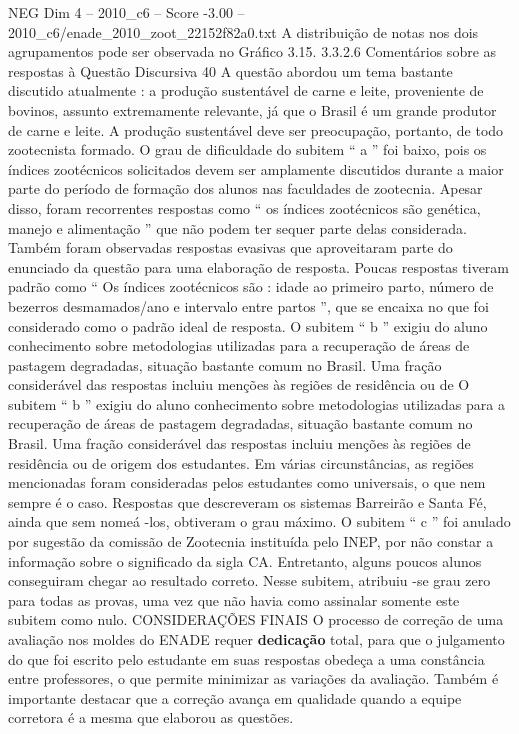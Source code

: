 \begin{textsample}{NEG Dim 4 – 2010\_c6 – Score -3.00 – 2010\_c6/enade\_2010\_zoot\_22152f82a0.txt}
A distribuição de notas nos dois agrupamentos pode ser observada no Gráfico 3.15. 3.3.2.6 Comentários sobre as respostas à Questão Discursiva 40 A questão abordou um tema bastante discutido atualmente : a produção sustentável de carne e leite, proveniente de bovinos, assunto extremamente relevante, já que o Brasil é um grande produtor de carne e leite.
A produção sustentável deve ser preocupação, portanto, de todo zootecnista formado.
O grau de dificuldade do subitem “ a ” foi baixo, pois os índices zootécnicos solicitados devem ser amplamente discutidos durante a maior parte do período de formação dos alunos nas faculdades de zootecnia.
Apesar disso, foram recorrentes respostas como “ os índices zootécnicos são genética, manejo e alimentação ” que não podem ter sequer parte delas considerada.
Também foram observadas respostas evasivas que aproveitaram parte do enunciado da questão para uma elaboração de resposta.
Poucas respostas tiveram padrão como “ Os índices zootécnicos são : idade ao primeiro parto, número de bezerros desmamados/ano e intervalo entre partos ”, que se encaixa no que foi considerado como o padrão ideal de resposta.
O subitem “ b ” exigiu do aluno conhecimento sobre metodologias utilizadas para a recuperação de áreas de pastagem degradadas, situação bastante comum no Brasil.
Uma fração considerável das respostas incluiu menções às regiões de residência ou de O subitem “ b ” exigiu do aluno conhecimento sobre metodologias utilizadas para a recuperação de áreas de pastagem degradadas, situação bastante comum no Brasil.
Uma fração considerável das respostas incluiu menções às regiões de residência ou de origem dos estudantes.
Em várias circunstâncias, as regiões mencionadas foram consideradas pelos estudantes como universais, o que nem sempre é o caso.
Respostas que descreveram os sistemas Barreirão e Santa Fé, ainda que sem nomeá -los, obtiveram o grau máximo.
O subitem “ c ” foi anulado por sugestão da comissão de Zootecnia instituída pelo INEP, por não constar a informação sobre o significado da sigla CA.
Entretanto, alguns poucos alunos conseguiram chegar ao resultado correto.
Nesse subitem, atribuiu -se grau zero para todas as provas, uma vez que não havia como assinalar somente este subitem como nulo.
CONSIDERAÇÕES FINAIS O processo de correção de uma avaliação nos moldes do ENADE requer \textbf{dedicação} total, para que o julgamento do que foi escrito pelo estudante em suas respostas obedeça a uma constância entre professores, o que permite minimizar as variações da avaliação.
Também é importante destacar que a correção avança em qualidade quando a equipe corretora é a mesma que elaborou as questões.

\end{textsample}
